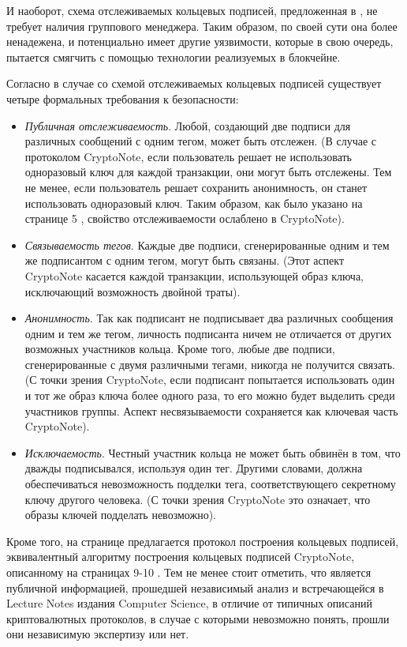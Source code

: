 \documentclass{mrl}
\numberwithin{equation}{section}
\numberwithin{figure}{section}
\begin{document}
И наоборот, схема отслеживаемых кольцевых подписей, предложенная в \cite{FS}, не требует наличия группового менеджера. Таким образом, по своей сути она более ненадежена, и потенциально имеет другие уязвимости, которые в свою очередь, \cite{CN} пытается смягчить с помощью технологии реализуемых в блокчейне.

Согласно \cite{FS} в случае со схемой отслеживаемых кольцевых подписей существует четыре формальных требования к безопасности:
\begin{itemize}
\item \textit{Публичная отслеживаемость}. Любой, создающий две подписи для различных сообщений с одним тегом, может быть отслежен. (В случае с протоколом CryptoNote, если пользователь решает не использовать одноразовый ключ для каждой транзакции, они могут быть отслежены. Тем не менее, если пользователь решает сохранить анонимность, он станет использовать одноразовый ключ. Таким образом, как было указано на странице 5 \cite{CN}, свойство отслеживаемости ослаблено в CryptoNote).

\item \textit{Связываемость тегов}. Каждые две подписи, сгенерированные одним и тем же подписантом с одним тегом, могут быть связаны. (Этот аспект CryptoNote касается каждой транзакции, использующей образ ключа, исключающий возможность двойной траты).

\item \textit{Анонимность}. Так как подписант не подписывает два различных сообщения одним и тем же тегом, личность подписанта ничем не отличается от других возможных участников кольца. Кроме того, любые две подписи, сгенерированные с двумя различными тегами, никогда не получится связать. (С точки зрения CryptoNote, если подписант попытается использовать один и тот же образ ключа более одного раза, то его можно будет выделить среди участников группы. Аспект несвязываемости сохраняется как ключевая часть CryptoNote).

\item \textit{Исключаемость}. Честный участник кольца не может быть обвинён в том, что дважды подписывался, используя один тег. Другими словами, должна обеспечиваться невозможность подделки тега, соответствующего секретному ключу другого человека. (С точки зрения CryptoNote это означает, что образы ключей подделать невозможно).

\end{itemize}
Кроме того, на странице \cite{FS} предлагается протокол построения кольцевых подписей, эквивалентный алгоритму построения кольцевых подписей CryptoNote, описанному на страницах 9-10 \cite{CN}. Тем не менее стоит отметить, что \cite{FS} является публичной информацией, прошедшей независимый анализ и встречающейся в Lecture Notes издания Computer Science, в отличие от типичных описаний криптовалютных протоколов, в случае с которыми невозможно понять, прошли они независимую экспертизу или нет.
\end{document}
